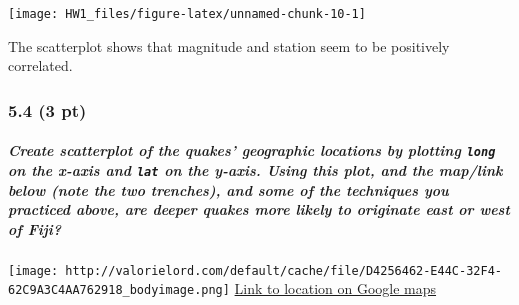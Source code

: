 \documentclass[
]{article}
\newenvironment{Shaded}{\begin{snugshade}}{\end{snugshade}}
\newcommand{\FunctionTok}[1]{\textcolor[rgb]{0.00,0.00,0.00}{#1}}
\newcommand{\NormalTok}[1]{#1}
\newcommand{\SpecialCharTok}[1]{\textcolor[rgb]{0.00,0.00,0.00}{#1}}
\begin{document}
\begin{Shaded}
\end{Shaded}

\begin{center}\texttt{[image: HW1\_files/figure-latex/unnamed-chunk-10-1]} \end{center}

The scatterplot shows that magnitude and station seem to be positively
correlated.

\hypertarget{pt-4}{%
\subsubsection{5.4 (3 pt)}\label{pt-4}}

\hypertarget{create-scatterplot-of-the-quakes-geographic-locations-by-plotting-long-on-the-x-axis-and-lat-on-the-y-axis.-using-this-plot-and-the-maplink-below-note-the-two-trenches-and-some-of-the-techniques-you-practiced-above-are-deeper-quakes-more-likely-to-originate-east-or-west-of-fiji}{%
\subparagraph{\texorpdfstring{Create scatterplot of the quakes'
geographic locations by plotting \texttt{long} on the x-axis and
\texttt{lat} on the y-axis. Using this plot, and the map/link below
(note the two trenches), and some of the techniques you practiced above,
are deeper quakes more likely to originate east or west of
Fiji?}{Create scatterplot of the quakes' geographic locations by plotting long on the x-axis and lat on the y-axis. Using this plot, and the map/link below (note the two trenches), and some of the techniques you practiced above, are deeper quakes more likely to originate east or west of Fiji?}}\label{create-scatterplot-of-the-quakes-geographic-locations-by-plotting-long-on-the-x-axis-and-lat-on-the-y-axis.-using-this-plot-and-the-maplink-below-note-the-two-trenches-and-some-of-the-techniques-you-practiced-above-are-deeper-quakes-more-likely-to-originate-east-or-west-of-fiji}}

\texttt{[image: http://valorielord.com/default/cache/file/D4256462-E44C-32F4-62C9A3C4AA762918\_bodyimage.png]}
\href{https://www.google.com/maps/@-20.1679389,175.7587479,3513560m/data=!3m1!1e3}{Link
to location on Google maps}

\begin{Shaded}
\end{Shaded}
\end{document}
